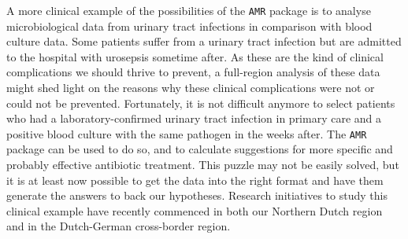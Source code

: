 \documentclass[
]{book}
\begin{document}
A more clinical example of the possibilities of the \texttt{AMR} package is to analyse microbiological data from urinary tract infections in comparison with blood culture data. Some patients suffer from a urinary tract infection but are admitted to the hospital with urosepsis sometime after. As these are the kind of clinical complications we should thrive to prevent, a full-region analysis of these data might shed light on the reasons why these clinical complications were not or could not be prevented. Fortunately, it is not difficult anymore to select patients who had a laboratory-confirmed urinary tract infection in primary care and a positive blood culture with the same pathogen in the weeks after. The \texttt{AMR} package can be used to do so, and to calculate suggestions for more specific and probably effective antibiotic treatment. This puzzle may not be easily solved, but it is at least now possible to get the data into the right format and have them generate the answers to back our hypotheses. Research initiatives to study this clinical example have recently commenced in both our Northern Dutch region and in the Dutch-German cross-border region.
\end{document}
